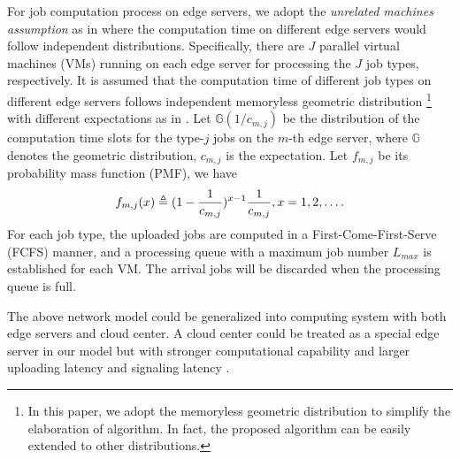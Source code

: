 For job computation process on edge servers, we adopt the \emph{unrelated machines assumption} as in \cite{tan-online} where the computation time on different edge servers would follow independent distributions.
Specifically, there are $J$ parallel virtual machines (VMs) running on each edge server for processing the $J$ job types, respectively.
It is assumed that the computation time of different job types on different edge servers follows independent memoryless geometric distribution 
\footnote{In this paper, we adopt the memoryless geometric distribution to simplify the elaboration of algorithm. In fact, the proposed algorithm can be easily extended to other distributions.}
with different expectations as in \cite{TOWC18-HuangKb}.
Let $\mathbb{G}(1/c_{m,j})$ be the distribution of the computation time slots for the type-$j$ jobs on the $m$-th edge server, where $\mathbb{G}$ denotes the geometric distribution, $c_{m,j}$ is the expectation.
Let $f_{m,j}$ be its probability mass function (PMF), we have
\begin{align}
    f_{m,j}(x) \triangleq (1-\frac{1}{c_{m,j}})^{x-1} \frac{1}{c_{m,j}}, x=1,2,\dots.
\end{align}
For each job type, the uploaded jobs are computed in a First-Come-First-Serve (FCFS) manner, and a processing queue with a maximum job number $L_{max}$ is established for each VM.
The arrival jobs will be discarded when the processing queue is full.

\begin{remark}%
    The above network model could be generalized into  computing system with both edge servers and cloud center.
    A cloud center could be treated as a special edge server in our model but with stronger computational capability and larger uploading latency and signaling latency .
\end{remark}

